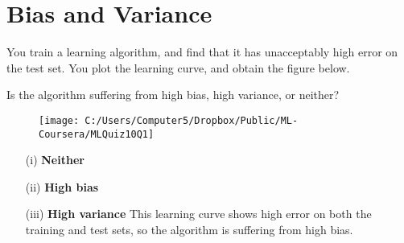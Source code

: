 \documentclass[]{article}
\begin{document}
\section*{Bias and Variance}

You train a learning algorithm, and find that it has unacceptably high error on the test set. You plot the learning curve, and obtain the figure below. 

Is the algorithm suffering from high bias, high variance, or neither?

\begin{figure}[h!]
\centering
\texttt{[image: C:/Users/Computer5/Dropbox/Public/ML-Coursera/MLQuiz10Q1]}
\label{fig:MLQuiz10Q1}
\end{figure}

\begin{itemize}
\item[(i)] \textbf{Neither	}		

\item[(ii)] \textbf{High bias}			

\item[(iii)] \textbf{High variance}	This learning curve shows high error on both the training and test sets, so the algorithm is suffering from high bias.
\end{itemize}
\end{document}
